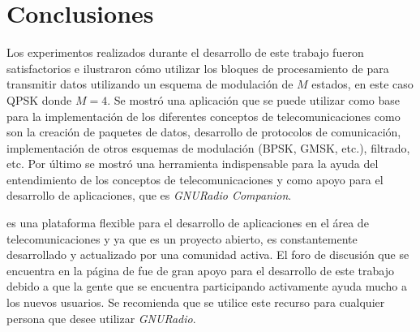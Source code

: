 \chapter{Conclusiones}
Los experimentos realizados durante el desarrollo de este trabajo fueron satisfactorios e ilustraron c\'omo utilizar los bloques
de procesamiento de \gnuradio para transmitir datos utilizando un esquema de modulaci\'on de $M$ estados, en este caso QPSK donde
$M=4$. Se mostr\'o una aplicaci\'on que se puede utilizar como base para la implementaci\'on de los diferentes conceptos de
telecomunicaciones como son la creaci\'on de paquetes de datos, desarrollo de protocolos de comunicaci\'on, implementaci\'on de
otros esquemas de modulaci\'on (BPSK, GMSK, etc.), filtrado, etc. Por \'ultimo se mostr\'o una herramienta indispensable para la
ayuda del entendimiento de los conceptos de telecomunicaciones y como apoyo para el desarrollo de aplicaciones, que es
\emph{GNURadio Companion}.

\gnuradio es una plataforma flexible para el desarrollo de aplicaciones en el \'area de telecomunicaciones y ya que es
un proyecto abierto, es constantemente desarrollado y actualizado por una comunidad activa. El foro de discusi\'on que se
encuentra en la p\'agina de \gnuradio \cite{radio} fue de gran apoyo para el desarrollo de este trabajo debido a que la gente que
se encuentra participando activamente ayuda mucho a los nuevos usuarios. Se recomienda que se utilice este
recurso para cualquier persona que desee utilizar \emph{GNURadio}.


